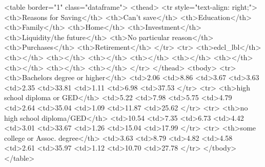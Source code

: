 <table border="1" class="dataframe">
  <thead>
    <tr style="text-align: right;">
      <th>Reasons for Saving</th>
      <th>Can't save</th>
      <th>Education</th>
      <th>Family</th>
      <th>Home</th>
      <th>Investment</th>
      <th>Liquidity/the future</th>
      <th>No particular reason</th>
      <th>Purchases</th>
      <th>Retirement</th>
    </tr>
    <tr>
      <th>edcl_lbl</th>
      <th></th>
      <th></th>
      <th></th>
      <th></th>
      <th></th>
      <th></th>
      <th></th>
      <th></th>
      <th></th>
    </tr>
  </thead>
  <tbody>
    <tr>
      <th>Bachelors degree or higher</th>
      <td>2.06%
      <td>8.86%
      <td>3.67%
      <td>3.63%
      <td>2.35%
      <td>33.81%
      <td>1.11%
      <td>6.98%
      <td>37.53%
    </tr>
    <tr>
      <th>high school diploma or GED</th>
      <td>5.22%
      <td>7.98%
      <td>5.75%
      <td>4.79%
      <td>2.64%
      <td>35.04%
      <td>1.09%
      <td>11.87%
      <td>25.62%
    </tr>
    <tr>
      <th>no high school diploma/GED</th>
      <td>10.54%
      <td>7.35%
      <td>6.73%
      <td>4.42%
      <td>3.01%
      <td>33.67%
      <td>1.26%
      <td>15.04%
      <td>17.99%
    </tr>
    <tr>
      <th>some college or Assoc. degree</th>
      <td>3.63%
      <td>8.79%
      <td>4.82%
      <td>4.58%
      <td>2.61%
      <td>35.97%
      <td>1.12%
      <td>10.70%
      <td>27.78%
    </tr>
  </tbody>
</table>